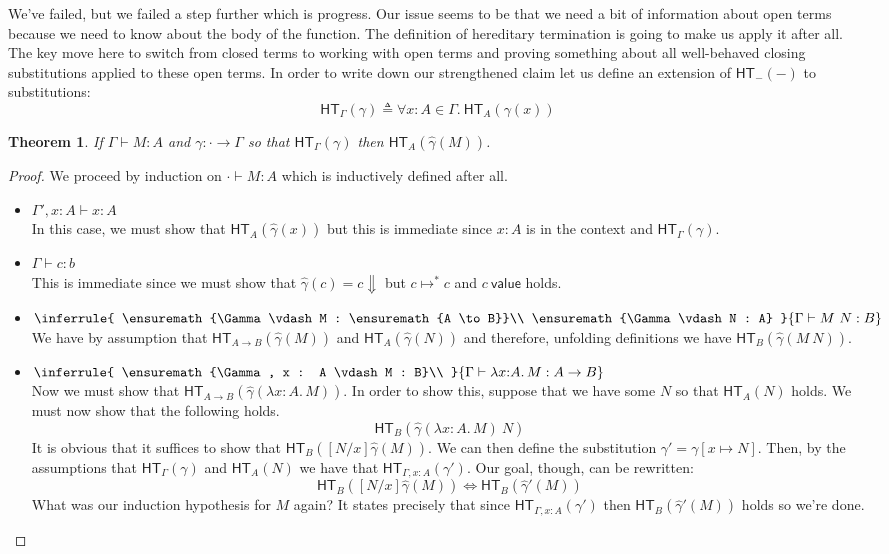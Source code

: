 \documentclass{article}
\newtheorem{thm}{Theorem}
\newcommand{\hasEF}[3]{\ensuremath{#1 \vdash #2 : #3}}
\newcommand{\hterm}[2]{\ensuremath{\mathsf{HT}_{#1}(#2)}}
\newcommand{\steps}[2]{\ensuremath{#1 \mapsto^* #2}}
\newcommand{\valueJ}[1]{\ensuremath{#1\ \mathsf{value}}}
\newcommand{\fn}[2]{\ensuremath{#1 \to #2}}
\newcommand{\ap}[2]{\ensuremath{#1\ #2}}
\newcommand{\lam}[3]{\ensuremath{\lambda #1 {:} #2.\, #3}}
\begin{document}
We've failed, but we failed a step further which is progress. Our
issue seems to be that we need a bit of information about open terms
because we need to know about the body of the function. The definition
of hereditary termination is going to make us apply it after all. The
key move here to switch from closed terms to working with open terms
and proving something about all well-behaved closing substitutions
applied to these open terms. In order to write down our strengthened
claim let us define an extension of $\hterm{-}{-}$ to substitutions:
\[
  \hterm{\Gamma}{\gamma} \triangleq \forall x : A \in \Gamma.\ \hterm{A}{\gamma(x)}
\]
\begin{thm}
  If $\hasEF{\Gamma}{M}{A}$ and $\gamma : \cdot \to \Gamma$ so that
  $\hterm{\Gamma}{\gamma}$ then $\hterm{A}{\hat{\gamma}(M)}$.
\end{thm}
\begin{proof}
  We proceed by induction on $\hasEF{\cdot}{M}{A}$ which is
  inductively defined after all.
  \begin{itemize}
  \setlength\itemsep{1em}
  \item $\hasEF{\Gamma', x : A}{x}{A}$\\
    In this case, we must show that $\hterm{A}{\hat{\gamma}(x)}$ but
    this is immediate since $x : A$ is in the context and
    $\hterm{\Gamma}{\gamma}$.
  \item $\hasEF{\Gamma}{c}{b}$\\
    This is immediate since we must show that
    $\hat{\gamma}(c) = c \Downarrow$ but $\steps{c}{c}$ and
    $\valueJ{c}$ holds.
  \item $\inferrule{
      \hasEF{\Gamma}{M}{\fn{A}{B}}\\
      \hasEF{\Gamma}{N}{A}
    }{\hasEF{\Gamma}{\ap{M}{N}}{B}}$\\
    We have by assumption that $\hterm{\fn{A}{B}}{\hat{\gamma}(M)}$
    and $\hterm{A}{\hat{\gamma}(N)}$ and therefore, unfolding
    definitions we have $\hterm{B}{\hat{\gamma}(\ap{M}{N})}$.
  \item
    $\inferrule{
      \hasEF{\Gamma, x : A}{M}{B}\\
    }{\hasEF{\Gamma}{\lam{x}{A}{M}}{\fn{A}{B}}}$\\

    Now we must show that
    $\hterm{\fn{A}{B}}{\hat{\gamma}(\lam{x}{A}{M})}$. In order to show
    this, suppose that we have some $N$ so that $\hterm{A}{N}$
    holds. We must now show that the following holds.
    \[
      \hterm{B}{\ap{\hat{\gamma}(\lam{x}{A}{M})}{N}}
    \]
    It is obvious that it suffices to show that
    $\hterm{B}{[N/x]\hat{\gamma}(M)}$. We can then define the
    substitution $\gamma' = \gamma[x \mapsto N]$. Then, by the
    assumptions that $\hterm{\Gamma}{\gamma}$ and $\hterm{A}{N}$ we
    have that $\hterm{\Gamma, x : A}{\gamma'}$. Our goal, though, can
    be rewritten:
    \[
      \hterm{B}{[N/x]\hat{\gamma}(M)} \iff
      \hterm{B}{\hat{\gamma}'(M)}
    \]
    What was our induction hypothesis for $M$ again? It states
    precisely that since $\hterm{\Gamma, x : A}{\gamma'}$ then
    $\hterm{B}{\hat{\gamma}'(M)}$ holds so we're done. \qedhere
  \end{itemize}
\end{proof}
\end{document}
